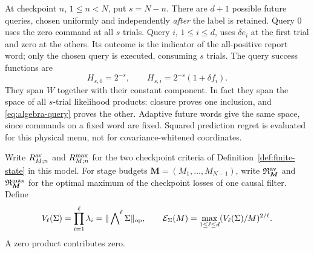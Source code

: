 At checkpoint $n$, $1\le n<N$, put $s=N-n$. There are $d+1$ possible
future queries, chosen uniformly and independently \emph{after} the
label is retained. Query $0$ uses the zero command at all $s$ trials.
Query $i$, $1\le i\le d$, uses $\delta e_i$ at the first trial and
zero at the others. Its outcome is the indicator of the all-positive
report word; only the chosen query is executed, consuming $s$ trials.
The query success functions are
\begin{equation}\label{eq:algebra-query}
 H_{s,0}=2^{-s},\qquad H_{s,i}=2^{-s}(1+\delta f_i).
\end{equation}
They span $W$ together with their constant component. In fact they span
the space of all $s$-trial likelihood products: closure proves one
inclusion, and \eqref{eq:algebra-query} proves the other. Adaptive
future words give the same space, since commands on a fixed word are
fixed. Squared prediction regret is evaluated for this physical menu,
not for covariance-whitened coordinates.

Write $R^{\rm av}_{M;n}$ and $R^{\rm max}_{M;n}$ for the two
checkpoint criteria of Definition~\ref{def:finite-state} in this model.
For stage budgets $\boldsymbol M=(M_1,\ldots,M_{N-1})$, write
$\mathfrak R^{\rm av}_{\boldsymbol M}$ and
$\mathfrak R^{\rm max}_{\boldsymbol M}$ for the optimal maximum of
the checkpoint losses of one causal filter. Define
\begin{equation}\label{eq:algebra-profile}
 V_\ell(\Sigma)=\prod_{i=1}^\ell\lambda_i
       =\|\mathop{\bigwedge}\nolimits^\ell\Sigma\|_{\rm op},
 \qquad
 \mathcal E_\Sigma(M)=\max_{1\le\ell\le d}
                   (V_\ell(\Sigma)/M)^{2/\ell}.
\end{equation}
A zero product contributes zero.

